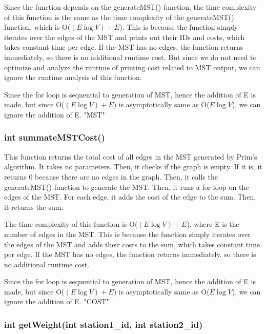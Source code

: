 			Since the function depends on the {\color{draculapurple}generateMST()} function, the time complexity of this function is the same as the time 
			complexity of the {\color{draculapurple}generateMST()} function, which is {\color{lightblue}O($(E \log V)+E$)}. This is because the function 
			simply iterates over the edges of the MST and prints out their IDs and costs, which takes constant time per edge. If the MST has no edges, the 
			function returns immediately, so there is no additional runtime cost.
			But since we do not need to optimize and analyze the runtime of printing cost related to MST output, we can ignore the runtime analysis of this function.
			

			Since the for loop is sequential to generation of MST, hence the addition of E is made, but since {\color{lightblue}O($(E \log V)+E$)} is asymptotically same as {\color{lightblue}O($E \log V$)}, we can ignore the addition of E.
			{\color{GoldenYellow}"MST"}

		\subsubsection{{\color{orange}int} {\color{draculapurple}summateMSTCost}()}

			This function returns the total cost of all edges in the MST generated by Prim's algorithm. It takes no parameters.
			Then, it checks if the graph is empty. If it is, it returns {\color{draculapurple}0} because there are no edges in the graph.
			Then, it calls the {\color{draculapurple}generateMST()} function to generate the MST. Then, it runs a for loop on the edges of the MST. For each edge, it adds the cost of the edge to the sum.
			Then, it returns the sum.

			The time complexity of this function is {\color{lightblue}O($(E \log V)+E$)}, where {\color{draculapurple}E} is the number of edges in the MST. 
			This is because the function simply iterates over the edges of the MST and adds their costs to the sum, which takes constant time per edge. If 
			the MST has no edges, the function returns immediately, so there is no additional runtime cost.

			Since the for loop is sequential to generation of MST, hence the addition of E is made, but since {\color{lightblue}O($(E \log V)+E$)} is asymptotically same as {\color{lightblue}O($E \log V$)}, we can ignore the addition of E.
			{\color{GoldenYellow}"COST"}


		\subsubsection{{\color{orange}int} {\color{draculapurple}getWeight}({\color{orange}int} station1\_id, {\color{orange}int} station2\_id)}


